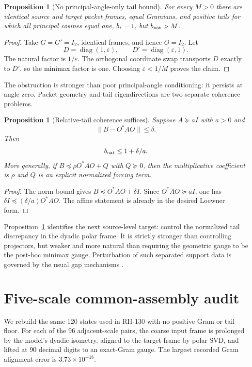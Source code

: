\documentclass[12pt]{article}
\newtheorem{proposition}[theorem]{Proposition}
\begin{document}
\begin{proposition}[No principal-angle-only tail bound]\label{prop:noangle}
For every $M>0$ there are identical source and target packet frames, equal
Gramians, and positive tails for which all principal cosines equal one,
$b_*=1$, but $b_{\rm nat}>M$.
\end{proposition}
\begin{proof}
Take $G=G'=I_2$, identical frames, and hence $O=I_2$.  Let
\[
 D=\operatorname{diag}(1,\varepsilon),\qquad
 D'=\operatorname{diag}(\varepsilon,1).
\]
The natural factor is $1/\varepsilon$.  The orthogonal coordinate swap
transports $D$ exactly to $D'$, so the minimax factor is one.  Choosing
$\varepsilon<1/M$ proves the claim.
\end{proof}

The obstruction is stronger than poor principal-angle conditioning: it
persists at angle zero.  Packet geometry and tail eigendirections are two
separate coherence problems.

\begin{proposition}[Relative-tail coherence suffices]\label{prop:coherence}
Suppose $A\succeq aI$ with $a>0$ and
\[
 \|B-O^*AO\|\leq\delta.
\]
Then
\[
 b_{\rm nat}\leq1+\delta/a.
\]
More generally, if $B\preceq\rho O^*AO+Q$ with $Q\succeq0$, then the
multiplicative coefficient is $\rho$ and $Q$ is an explicit normalized
forcing term.
\end{proposition}
\begin{proof}
The norm bound gives $B\preceq O^*AO+\delta I$.  Since
$O^*AO\succeq aI$, one has
$\delta I\preceq(\delta/a)O^*AO$.  The affine statement is already in the
desired Loewner form.
\end{proof}

Proposition~\ref{prop:coherence} identifies the next source-level target:
control the normalized tail discrepancy in the dyadic polar frame.  It is
strictly stronger than controlling projectors, but weaker and more natural
than requiring the geometric gauge to be the post-hoc minimax gauge.
Perturbation of such separated support data is governed by the usual gap
mechanisms \citep{Kato1995}.

\section{Five-scale common-assembly audit}
We rebuild the same 120 states used in RH-130 with no positive Gram or tail
floor.  For each of the 96 adjacent-scale pairs, the coarse input frame is
prolonged by the model's dyadic isometry, aligned to the target frame by
polar SVD, and lifted at 90 decimal digits to an exact-Gram gauge.  The
largest recorded Gram alignment error is $3.73\times10^{-18}$.
\end{document}
